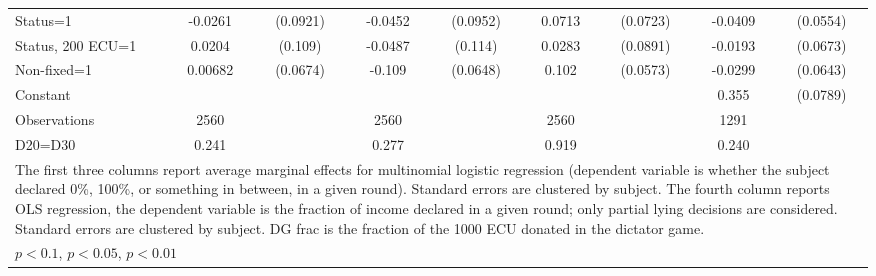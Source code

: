 \begin{tabular}{l|cccccc|cc}
Status=1        &  -0.0261         & (0.0921)&  -0.0452         & (0.0952)&   0.0713         & (0.0723)&  -0.0409         & (0.0554)\\
Status, 200 ECU=1&   0.0204         &  (0.109)&  -0.0487         &  (0.114)&   0.0283         & (0.0891)&  -0.0193         & (0.0673)\\
Non-fixed=1     &  0.00682         & (0.0674)&   -0.109\sym{*}  & (0.0648)&    0.102\sym{*}  & (0.0573)&  -0.0299         & (0.0643)\\
Constant        &                  &         &                  &         &                  &         &    0.355\sym{***}& (0.0789)\\
\hline
Observations    &     2560         &         &     2560         &         &     2560         &         &     1291         &         \\
D20=D30         &    0.241         &         &    0.277         &         &    0.919         &         &    0.240         &         \\
\hline\hline
\multicolumn{9}{p{16cm}}{\tiny The first three columns report average marginal effects for multinomial logistic regression (dependent variable is whether the subject declared 0\%,  100\%, or something in between, in a given round). Standard errors are clustered by subject. The fourth column reports OLS regression, the dependent variable is the fraction of income declared in a given round; only partial lying decisions are considered. Standard errors are clustered by subject. DG frac is the fraction of the 1000 ECU donated in the dictator game.}\\
\multicolumn{9}{l}{\tiny \sym{*} \(p<0.1\), \sym{**} \(p<0.05\), \sym{***} \(p<0.01\)}\\
\end{tabular}